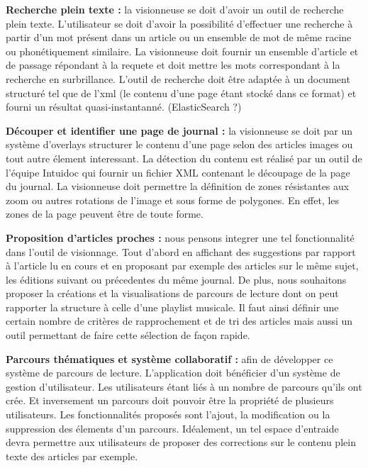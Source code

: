 	\textbf{Recherche plein texte :} la visionneuse se doit d’avoir un outil de recherche plein texte. L’utilisateur se doit d’avoir la possibilité d’effectuer une recherche à partir d’un mot présent dans un article ou un ensemble de mot de même racine ou phonétiquement similaire. La visionneuse doit fournir un ensemble d’article et de passage répondant à la requete et doit mettre les mots correspondant à la recherche en surbrillance. L’outil de recherche doit être adaptée à un document structuré tel que de l’xml (le contenu d’une page étant stocké dans ce format) et fourni un résultat quasi-instantanné. (ElasticSearch ?)
	

	\textbf{Découper et identifier une page de journal :} la visionneuse se doit par un système d’overlays structurer le contenu d’une page selon des articles images ou tout autre élement interessant. La détection du contenu est réalisé par un outil de l’équipe Intuidoc qui fournir un fichier XML contenant le découpage de la page du journal. La visionneuse doit permettre la définition de zones résistantes aux zoom ou autres rotations de l’image et sous forme de polygones. En effet, les zones de la page peuvent être de toute forme.


	\textbf{Proposition d’articles proches :} nous pensons integrer une tel fonctionnalité dans l’outil de visionnage. Tout d’abord en affichant des suggestions par rapport à l’article lu en cours et en proposant par exemple des articles sur le même sujet, les éditions suivant ou précedentes du même journal. De plus, nous souhaitons proposer la créations et la visualisations de parcours de lecture dont on peut rapporter la structure à celle d’une playlist musicale. Il faut ainsi définir une certain nombre de critères de rapprochement et de tri des articles mais aussi un outil permettant de faire cette sélection de façon rapide.
	

	\textbf{Parcours thématiques et système collaboratif :} afin de développer ce système de parcours de lecture. L’application doit bénéficier d’un système de gestion d’utilisateur. Les utilisateurs étant liés à un nombre de parcours qu’ils ont crée. Et inversement un parcours doit pouvoir être la propriété de plusieurs utilisateurs. Les fonctionnalités proposés sont l’ajout, la modification ou la suppression des élements d’un parcours. Idéalement, un tel espace d’entraide devra permettre aux utilisateurs de proposer des corrections sur le contenu plein texte des articles par exemple.